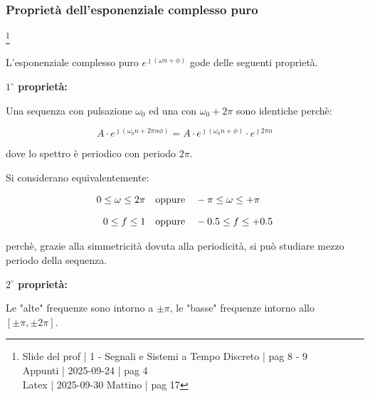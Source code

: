 \newpage 

\subsubsection{Proprietà dell'esponenziale complesso puro}

\footnote{ 
    Slide del prof | 1 - Segnali e Sistemi a Tempo Discreto | pag 8 - 9\\
    Appunti | 2025-09-24 | pag 4 \\ 
    Latex | 2025-09-30 Mattino | pag 17
}

L'esponenziale complesso puro $e^{\jmath \left( \omega n + \phi\right)}$ gode delle seguenti proprietà. \newline 

\textbf{$1^{\circ}$ proprietà: } \newline 

Una sequenza con pulsazione $\omega_0$ ed una con $\omega_0 + 2 \pi$ sono identiche perchè: 

{
    \Large 
    \begin{equation}
        A \cdot e^{\jmath \left( \omega_0 n + 2 \pi n \phi\right)}
        = 
        A \cdot e^{\jmath \left( \omega_0 n + \phi\right)} \cdot e^{\jmath 2 \pi n} 
    \end{equation}
}

dove lo spettro è periodico con periodo $2 \pi$. \newline 

Si considerano equivalentemente: 

{
    \Large 
    \begin{equation}
        \setlength{\jot}{10pt} %
        \begin{split}
        0 \leq \omega \leq 2 \pi 
        \quad
        &\text{oppure}
        \quad
        - \pi \leq \omega \leq + \pi 
        \\    
        0 \leq f \leq 1 
        \quad
        &\text{oppure}
        \quad 
        -0.5 \leq f \leq +0.5    
    \end{split}
    \end{equation}
}


perchè, grazie alla simmetricità dovuta alla periodicità, 
si può studiare mezzo periodo della sequenza. \newline 

\textbf{$2^{\circ}$ proprietà: } \newline 

Le "alte" frequenze sono intorno a $\pm \pi$, le "basse" frequenze intorno allo $[\pm \pi, \pm 2 \pi]$. \newline 

